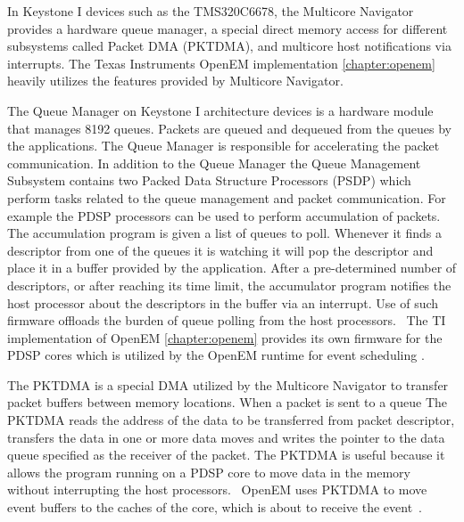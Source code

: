 In Keystone I devices such as the TMS320C6678, the Multicore Navigator provides a hardware queue manager, a special direct memory access for different subsystems called Packet DMA (PKTDMA), and multicore host notifications via interrupts. \cite{navigator} The Texas Instruments OpenEM implementation \ref{chapter:openem} heavily utilizes the features provided by Multicore Navigator.

The Queue Manager on Keystone I architecture devices is a hardware module that manages 8192 queues. Packets are queued and dequeued from the queues by the applications. The Queue Manager is responsible for accelerating the packet communication. In addition to the Queue Manager the Queue Management Subsystem contains two Packed Data Structure Processors (PSDP) which perform tasks related to the queue management and packet communication. For example the PDSP processors can be used to perform accumulation of packets. The accumulation program is given a list of queues to poll. Whenever it finds a descriptor from one of the queues it is watching it will pop the descriptor and place it in a buffer provided by the application. After a pre-determined number of descriptors, or after reaching its time limit, the accumulator program notifies the host processor about the descriptors in the buffer via an interrupt. Use of such firmware offloads the burden of queue polling from the host processors.~\cite{navigator} The TI implementation of OpenEM \ref{chapter:openem} provides its own firmware for the PDSP cores which is utilized by the OpenEM runtime for event scheduling \cite{moerman2014open}.

The PKTDMA is a special DMA utilized by the Multicore Navigator to transfer packet buffers between memory locations. When a packet is sent to a queue The PKTDMA reads the address of the data to be transferred from packet descriptor, transfers the data in one or more data moves and writes the pointer to the data queue specified as the receiver of the packet. The PKTDMA is useful because it allows the program running on a PDSP core to move data in the memory without interrupting the host processors.~\cite{navigator} OpenEM uses PKTDMA to move event buffers to the caches of the core, which is about to receive the event~\cite{moerman2014open}.

